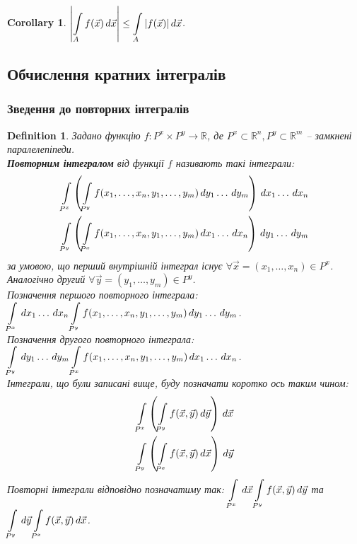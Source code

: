 \documentclass[a4paper, 10pt]{article}
\def\huge{\displaystyle}
\theoremstyle{theoremdd}
\theoremstyle{theoremdd}
\newtheorem{definition}[theorem]{Definition}
\theoremstyle{theoremdd}
\theoremstyle{theoremdd}
\theoremstyle{theoremdd}
\theoremstyle{theoremdd}
\theoremstyle{theoremdd}
\theoremstyle{theoremdd}
\theoremstyle{theoremdd}
\theoremstyle{theoremdd}
\theoremstyle{theoremdd}
\theoremstyle{theoremdd}
\theoremstyle{theoremdd}
\theoremstyle{theoremdd}
\newtheorem{corollary}[theorem]{Corollary}
\theoremstyle{theoremdd}
\begin{document}
\begin{corollary}
$\huge \abs{\int\displaylimits_A f(\vec{x})\,d\vec{x}} \leq \int\displaylimits_A |f(\vec{x})|\,d\vec{x}$.
\end{corollary}

\subsection{Обчислення кратних інтегралів}
\subsubsection{Зведення до повторних інтегралів}
\begin{definition}
Задано функцію $f \colon P^x \times P^y \to \mathbb{R}$, де $P^x \subset \mathbb{R}^n, P^y \subset \mathbb{R}^m$ -- замкнені паралелепіпеди.\\
\textbf{Повторним інтегралом} від функції $f$ називають такі інтеграли:
\begin{align*}
\int\displaylimits_{P^x} \left( \int\displaylimits_{P^y} f(x_1,\dots,x_n,y_1,\dots,y_m)\,dy_1\dots\,dy_m \right)\,dx_1\dots\,dx_n \\
\int\displaylimits_{P^y} \left( \int\displaylimits_{P^x} f(x_1,\dots,x_n,y_1,\dots,y_m)\,dx_1\dots\,dx_n \right)\,dy_1\dots\,dy_m
\end{align*}
за умовою, що перший внутрішній інтеграл існує $\forall \vec{x} = (x_1,\dots,x_n) \in P^x$. Аналогічно другий $\forall \vec{y} = (y_1,\dots,y_m) \in P^y$.\\
Позначення першого повторного інтеграла: $\huge\int\displaylimits_{P^x}\,dx_1\dots\,dx_n \int\displaylimits_{P^y} f(x_1,\dots,x_n,y_1,\dots,y_m)\,dy_1\dots\,dy_m$.\\
Позначення другого повторного інтеграла: $\huge\int\displaylimits_{P^y}\,dy_1\dots\,dy_m \int\displaylimits_{P^x} f(x_1,\dots,x_n,y_1,\dots,y_m)\,dx_1\dots\,dx_n$.
\bigskip \\
Інтеграли, що були записані вище, буду позначати коротко ось таким чином:\\
\begin{align*}
\int\displaylimits_{P^x} \left( \int\displaylimits_{P^y} f(\vec{x},\vec{y})\,d\vec{y}\right)\,d\vec{x} \\
\int\displaylimits_{P^y} \left( \int\displaylimits_{P^x} f(\vec{x},\vec{y})\,d\vec{x}\right)\,d\vec{y}
\end{align*}
Повторні інтеграли відповідно позначатиму так: $\displaystyle\int\displaylimits_{P^x}\,d\vec{x} \int\displaylimits_{P^y} f(\vec{x},\vec{y})\,d\vec{y}$ та $\displaystyle\int\displaylimits_{P^y}\,d\vec{y} \int\displaylimits_{P^x} f(\vec{x},\vec{y})\,d\vec{x}$.
\end{definition}
\end{document}
